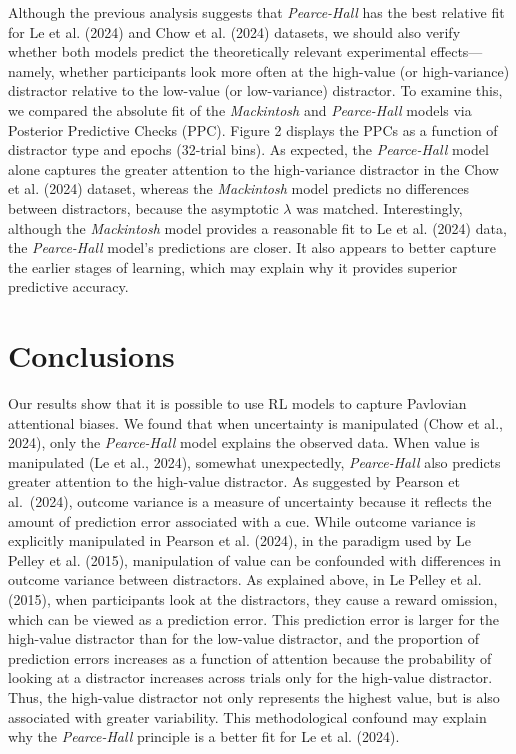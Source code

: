 \documentclass[11pt]{article}
\begin{document}
Although the previous analysis suggests that \emph{Pearce-Hall} has the
best relative fit for Le et al. (2024) and Chow et al. (2024) datasets,
we should also verify whether both models predict the theoretically
relevant experimental effects---namely, whether participants look more
often at the high-value (or high-variance) distractor relative to the
low-value (or low-variance) distractor. To examine this, we compared the
absolute fit of the \emph{Mackintosh} and \emph{Pearce-Hall} models via
Posterior Predictive Checks (PPC). Figure 2 displays the PPCs as a
function of distractor type and epochs (32-trial bins). As expected, the
\emph{Pearce-Hall} model alone captures the greater attention to the
high-variance distractor in the Chow et al. (2024) dataset, whereas the
\emph{Mackintosh} model predicts no differences between distractors,
because the asymptotic \(\lambda\) was matched. Interestingly, although
the \emph{Mackintosh} model provides a reasonable fit to Le et al.
(2024) data, the \emph{Pearce-Hall} model's predictions are closer. It
also appears to better capture the earlier stages of learning, which may
explain why it provides superior predictive accuracy.

\section{Conclusions}\label{conclusions}

Our results show that it is possible to use RL models to capture
Pavlovian attentional biases. We found that when uncertainty is
manipulated (Chow et al., 2024), only the \emph{Pearce-Hall} model
explains the observed data. When value is manipulated (Le et al., 2024),
somewhat unexpectedly, \emph{Pearce-Hall} also predicts greater
attention to the high-value distractor. As suggested by Pearson et
al.~(2024), outcome variance is a measure of uncertainty because it
reflects the amount of prediction error associated with a cue. While
outcome variance is explicitly manipulated in Pearson et al. (2024), in
the paradigm used by Le Pelley et al. (2015), manipulation of value can
be confounded with differences in outcome variance between distractors.
As explained above, in Le Pelley et al. (2015), when participants look
at the distractors, they cause a reward omission, which can be viewed as
a prediction error. This prediction error is larger for the high-value
distractor than for the low-value distractor, and the proportion of
prediction errors increases as a function of attention because the
probability of looking at a distractor increases across trials only for
the high-value distractor. Thus, the high-value distractor not only
represents the highest value, but is also associated with greater
variability. This methodological confound may explain why the
\emph{Pearce-Hall} principle is a better fit for Le et al. (2024).
\end{document}
